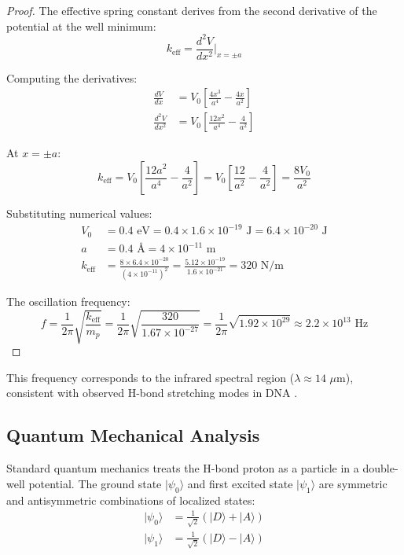 \documentclass[twocolumn,10pt]{article}
\theoremstyle{remark}
\begin{document}
\begin{proof}
The effective spring constant derives from the second derivative of the potential at the well minimum:
\begin{equation}
k_{\mathrm{eff}} = \frac{d^2V}{dx^2}\bigg|_{x=\pm a}
\end{equation}

Computing the derivatives:
\begin{align}
\frac{dV}{dx} &= V_0 \left[ \frac{4x^3}{a^4} - \frac{4x}{a^2} \right] \\
\frac{d^2V}{dx^2} &= V_0 \left[ \frac{12x^2}{a^4} - \frac{4}{a^2} \right]
\end{align}

At $x = \pm a$:
\begin{equation}
k_{\mathrm{eff}} = V_0 \left[ \frac{12a^2}{a^4} - \frac{4}{a^2} \right] = V_0 \left[ \frac{12}{a^2} - \frac{4}{a^2} \right] = \frac{8V_0}{a^2}
\end{equation}

Substituting numerical values:
\begin{align}
V_0 &= 0.4 \text{ eV} = 0.4 \times 1.6 \times 10^{-19} \text{ J} = 6.4 \times 10^{-20} \text{ J} \\
a &= 0.4 \text{ \AA} = 4 \times 10^{-11} \text{ m} \\
k_{\mathrm{eff}} &= \frac{8 \times 6.4 \times 10^{-20}}{(4 \times 10^{-11})^2} = \frac{5.12 \times 10^{-19}}{1.6 \times 10^{-21}} = 320 \text{ N/m}
\end{align}

The oscillation frequency:
\begin{equation}
f = \frac{1}{2\pi}\sqrt{\frac{k_{\mathrm{eff}}}{m_p}} = \frac{1}{2\pi}\sqrt{\frac{320}{1.67 \times 10^{-27}}} = \frac{1}{2\pi}\sqrt{1.92 \times 10^{29}} \approx 2.2 \times 10^{13} \text{ Hz}
\end{equation}
\end{proof}

This frequency corresponds to the infrared spectral region ($\lambda \approx 14$ $\mu$m), consistent with observed H-bond stretching modes in DNA \citep{banyay2003structural}.

\subsection{Quantum Mechanical Analysis}

Standard quantum mechanics treats the H-bond proton as a particle in a double-well potential. The ground state $|\psi_0\rangle$ and first excited state $|\psi_1\rangle$ are symmetric and antisymmetric combinations of localized states:
\begin{align}
|\psi_0\rangle &= \frac{1}{\sqrt{2}}(|D\rangle + |A\rangle) \\
|\psi_1\rangle &= \frac{1}{\sqrt{2}}(|D\rangle - |A\rangle)
\end{align}
\end{document}
